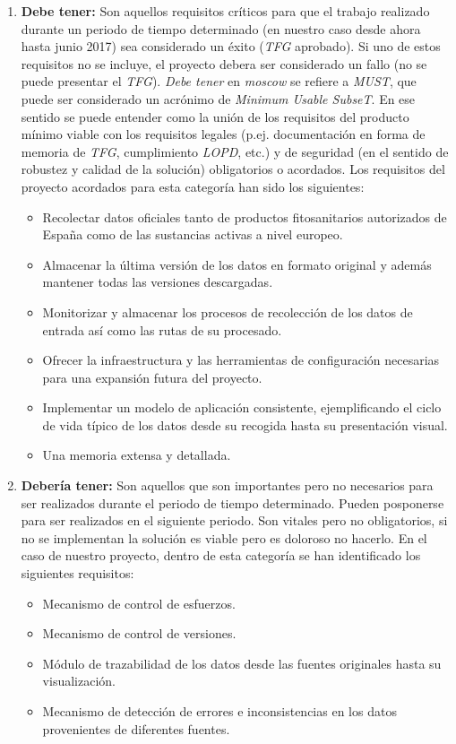 \begin{enumerate}
\item \textbf{Debe tener:} Son aquellos requisitos críticos para que el trabajo realizado durante un periodo de tiempo determinado (en nuestro caso desde ahora hasta junio 2017) sea considerado un éxito (\textit{TFG} aprobado). Si uno de estos requisitos no se incluye, el proyecto debera ser considerado un fallo (no se puede presentar el \textit{TFG}). \textit{Debe tener} en \textit{\gls{moscow}} se refiere a \textit{MUST}, que puede ser considerado un acrónimo de \textit{Minimum Usable SubseT}. En ese sentido se puede entender como la unión de los requisitos del producto mínimo viable con los requisitos legales (p.ej. documentación en forma de memoria de \textit{TFG}, cumplimiento \textit{LOPD}, etc.) y de seguridad (en el sentido de robustez y calidad de la solución) obligatorios o acordados. Los requisitos del proyecto acordados para esta categoría han sido los siguientes: 
\begin{itemize}
\item Recolectar datos oficiales tanto de productos fitosanitarios autorizados de España como de las sustancias activas a nivel europeo. 
\item Almacenar la última versión de los datos en formato original y además mantener todas las versiones descargadas. 
\item Monitorizar y almacenar los procesos de recolección de los datos de entrada así como las rutas de su procesado.
\item Ofrecer la infraestructura y las herramientas de configuración necesarias para una expansión futura del proyecto. 
\item Implementar un modelo de aplicación consistente, ejemplificando el ciclo de vida típico de los datos desde su recogida hasta su presentación visual. 
\item Una memoria extensa y detallada. 
\end{itemize}

\item \textbf{Debería tener:} Son aquellos que son importantes pero no necesarios para ser realizados durante el periodo de tiempo determinado. Pueden posponerse para ser realizados en el siguiente periodo. Son vitales pero no obligatorios, si no se implementan la solución es viable pero es doloroso no hacerlo. En el caso de nuestro proyecto, dentro de esta categoría se han identificado los siguientes requisitos: 
\begin{itemize}
\item Mecanismo de control de esfuerzos.
\item Mecanismo de control de versiones.
\item Módulo de trazabilidad de los datos desde las fuentes originales hasta su visualización. 
\item Mecanismo de detección de errores e inconsistencias en los datos provenientes de diferentes fuentes. 
\end{itemize}



\end{enumerate}
